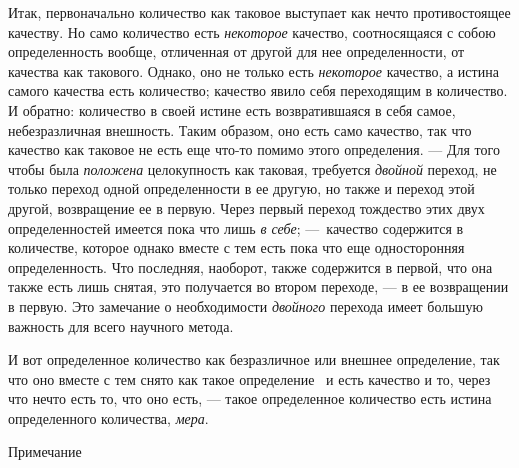 Итак, первоначально количество как таковое выступает как нечто
противостоящее качеству. Но само количество есть
{\em некоторое} качество, соотносящаяся с собою
определенность вообще, отличенная от другой для нее определенности, от
качества как такового. Однако, оно не только есть
{\em некоторое} качество, а истина самого качества есть
количество; качество явило себя переходящим в количество. И обратно:
количество в своей истине есть возвратившаяся в себя самое, небезразличная
внешность. Таким образом, оно есть само качество, так что качество как
таковое не есть еще что-то помимо этого определения. — Для того чтобы была
{\em положена} целокупность как таковая, требуется
{\em двойной} переход, не только переход одной
определенности в ее другую, но также и переход этой другой, возвращение ее
в первую. Через первый переход тождество этих двух определенностей имеется
пока что лишь {\em в себе}; —~качество содержится в
количестве, которое однако вместе с тем есть пока что еще односторонняя
определенность. Что последняя, наоборот, также содержится в первой, что она
также есть лишь снятая, это получается во втором переходе, — в ее
возвращении в первую. Это замечание о необходимости
{\em двойного} перехода имеет большую важность для
всего научного метода.

И вот определенное количество как безразличное или внешнее определение, так
что оно вместе с тем снято как такое
определение~
и есть качество и то, через что нечто есть то, что оно есть, — такое
определенное количество есть истина определенного количества,
{\em мера}.

{\centering
Примечание
\par}

